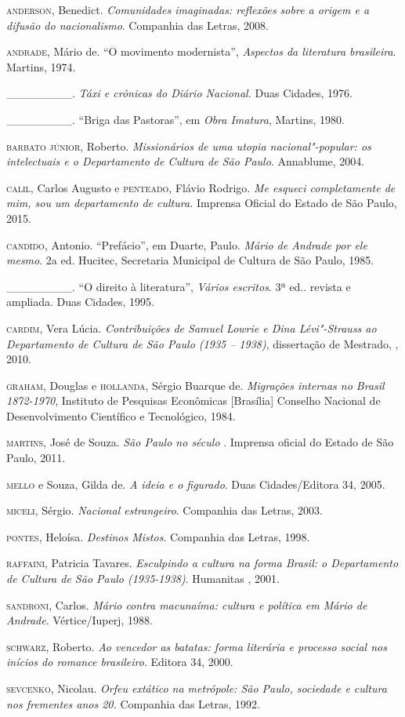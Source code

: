 \begin{Parskip}
\textsc{anderson}, Benedict. \emph{Comunidades imaginadas: reflexões sobre a origem e a
difusão do nacionalismo}. Companhia das Letras, 2008.

\textsc{andrade}, Mário de. ``O movimento modernista'', \emph{Aspectos da
literatura brasileira}. Martins, 1974.

\_\_\_\_\_\_\_\_. \emph{Táxi e crônicas do Diário Nacional.} Duas
Cidades, 1976.

\_\_\_\_\_\_\_\_. ``Briga das Pastoras'', em \emph{Obra Imatura},
Martins, 1980.

\textsc{barbato júnior}, Roberto. \emph{Missionários de uma utopia
nacional"-popular: os intelectuais e o Departamento de Cultura de São
Paulo}. Annablume, 2004.

\textsc{calil}, Carlos Augusto e \textsc{penteado}, Flávio Rodrigo. \emph{Me esqueci
completamente de mim, sou um departamento de cultura.} Imprensa Oficial
do Estado de São Paulo, 2015.

\textsc{candido}, Antonio. ``Prefácio'', em Duarte, Paulo. \emph{Mário de Andrade
por ele mesmo}. 2a ed. Hucitec, Secretaria Municipal de Cultura de São
Paulo, 1985.

\_\_\_\_\_\_\_\_. ``O direito à literatura'', \emph{Vários escritos}. 3ª
ed.. revista e ampliada. Duas Cidades, 1995.

\textsc{cardim}, Vera Lúcia. \emph{Contribuições de Samuel Lowrie e Dina
Lévi"-Strauss ao Departamento de Cultura de São Paulo (1935 -- 1938)},
dissertação de Mestrado, , 2010.

\textsc{graham}, Douglas e \textsc{hollanda}, Sérgio Buarque de. \emph{Migrações internas
no Brasil 1872-1970}, Instituto de Pesquisas Econômicas {[}Brasília{]}
Conselho Nacional de Desenvolvimento Científico e Tecnológico, 1984.

\textsc{martins}, José de Souza. \emph{São Paulo no século }. Imprensa oficial
do Estado de São Paulo, 2011.

\textsc{mello} e Souza, Gilda de. \emph{A ideia e o figurado}. Duas
Cidades/Editora 34, 2005.

\textsc{miceli}, Sérgio. \emph{Nacional estrangeiro}. Companhia das Letras, 2003.

\textsc{pontes}, Heloísa. \emph{Destinos Mistos}. Companhia das Letras, 1998.

\textsc{raffaini}, Patricia Tavares. \emph{Esculpindo a cultura na forma Brasil:
o Departamento de Cultura de São Paulo (1935-1938)}. Humanitas
, 2001.

\textsc{sandroni}, Carlos. \emph{Mário contra macunaíma: cultura e política em
Mário de Andrade}. Vértice/Iuperj, 1988.

\textsc{schwarz}, Roberto. \emph{Ao vencedor as batatas: forma literária e
processo social nos inícios do romance brasileiro}. Editora 34, 2000.

\textsc{sevcenko}, Nicolau. \emph{Orfeu extático na metrópole: São Paulo,
sociedade e cultura nos frementes anos 20.} Companhia das Letras, 1992.
\end{Parskip}

